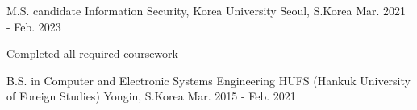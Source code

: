 

\begin{cventries}
  \cventry
    {M.S. candidate} %
    {Information Security, Korea University} %
    {Seoul, S.Korea} %
    {Mar. 2021 - Feb. 2023} %
    {
      \begin{cvitems} %
        \item {Completed all required coursework}
      \end{cvitems}
    }

  \cventry
    {B.S. in Computer and Electronic Systems Engineering} %
    {HUFS (Hankuk University of Foreign Studies)} %
    {Yongin, S.Korea} %
    {Mar. 2015 - Feb. 2021} %
    {
    }

\end{cventries}
